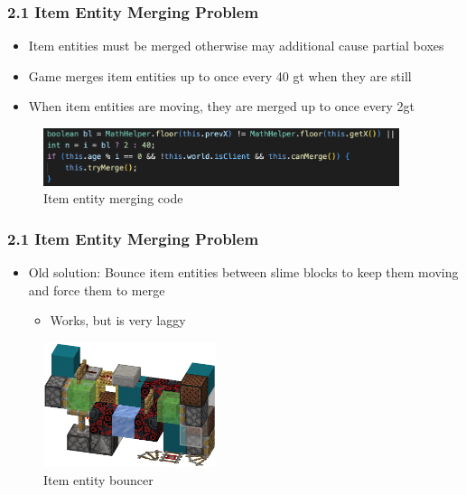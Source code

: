 \documentclass[aspectratio=169]{beamer}
\begin{document}
\begin{frame}
    \frametitle{2.1 Item Entity Merging Problem}
    \begin{itemize}
        \item Item entities must be merged otherwise may additional cause partial boxes
        \item Game merges item entities up to once every 40 gt when they are still
        \item When item entities are moving, they are merged up to once every 2gt
    \end{itemize}

    \begin{figure}
        \centering
        \includegraphics[width=0.93\textwidth]{mergecode.png}
        \caption{Item entity merging code}
    \end{figure}
    
\end{frame}

\begin{frame}
    \frametitle{2.1 Item Entity Merging Problem}
    \begin{itemize}
        \item Old solution: Bounce item entities between slime blocks to keep them moving and force them to merge
        \begin{itemize}
            \item Works, but is very laggy
        \end{itemize}
    \end{itemize}

    \begin{figure}
        \centering
        \includegraphics[width=0.45\textwidth]{bouncer.png}
        \caption{Item entity bouncer}
    \end{figure}
\end{frame}
\end{document}
